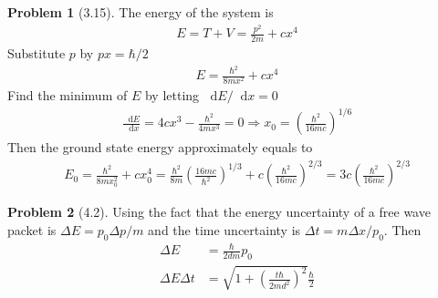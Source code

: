 \documentclass[twoside,11pt]{article}
\renewcommand*\d{\mathop{}\!\mathrm{d}}
\theoremstyle{definition}
\newtheorem{problem}{Problem}
\theoremstyle{remark}
\begin{document}
\begin{problem}[3.15]
The energy of the system is
\begin{align*}
    E = T + V = \frac{p^2}{2m} + cx^4
\end{align*}
Substitute $p$ by $px = \hbar/2$
\begin{align*}
    E = \frac{\hbar^2}{8mx^2} + cx^4
\end{align*}
Find the minimum of $E$ by letting $\d E/\d x=0$
\begin{align*}
    \frac{\d E}{\d x} = 4cx^3 - \frac{\hbar^2}{4mx^3} = 0\Rightarrow
    x_0=\left(\frac{\hbar^2}{16mc}\right)^{1/6}
\end{align*}
Then the ground state energy approximately equals to 
\begin{align*}
    E_0 = \frac{\hbar^2}{8mx_0^2} + cx_0^4 = \frac{\hbar^2}{8m}\left(
        \frac{16mc}{\hbar^2}
    \right)^{1/3}
    + c\left(\frac{\hbar^2}{16mc}\right)^{2/3} 
    = 3c\left(\frac{\hbar^2}{16mc}\right)^{2/3}
\end{align*}
\end{problem}


\begin{problem}[4.2]
    Using the fact that the energy uncertainty of a free wave packet is
    $\Delta E = p_0\Delta p/m$ and the time uncertainty is
    $\Delta t = m\Delta x/p_0$.
    Then 
    \begin{align*}
        \Delta E &= \frac{\hbar}{2dm}p_0\\
        \Delta E\Delta t &= \sqrt{1+\left(\frac{t\hbar}{2md^2}\right)^2}\frac{\hbar}{2}
    \end{align*}
\end{problem}
\end{document}
